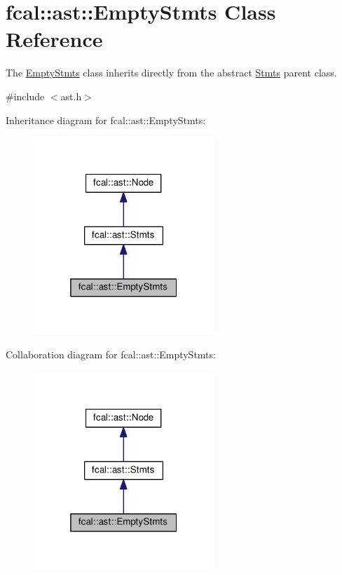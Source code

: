 \hypertarget{classfcal_1_1ast_1_1EmptyStmts}{}\section{fcal\+:\+:ast\+:\+:Empty\+Stmts Class Reference}
\label{classfcal_1_1ast_1_1EmptyStmts}


The \hyperlink{classfcal_1_1ast_1_1EmptyStmts}{Empty\+Stmts} class inherits directly from the abstract \hyperlink{classfcal_1_1ast_1_1Stmts}{Stmts} parent class.  




{\ttfamily \#include $<$ast.\+h$>$}



Inheritance diagram for fcal\+:\+:ast\+:\+:Empty\+Stmts\+:
\nopagebreak
\begin{figure}[H]
\begin{center}
\leavevmode
\includegraphics[width=193pt]{classfcal_1_1ast_1_1EmptyStmts__inherit__graph}
\end{center}
\end{figure}


Collaboration diagram for fcal\+:\+:ast\+:\+:Empty\+Stmts\+:
\nopagebreak
\begin{figure}[H]
\begin{center}
\leavevmode
\includegraphics[width=193pt]{classfcal_1_1ast_1_1EmptyStmts__coll__graph}
\end{center}
\end{figure}
